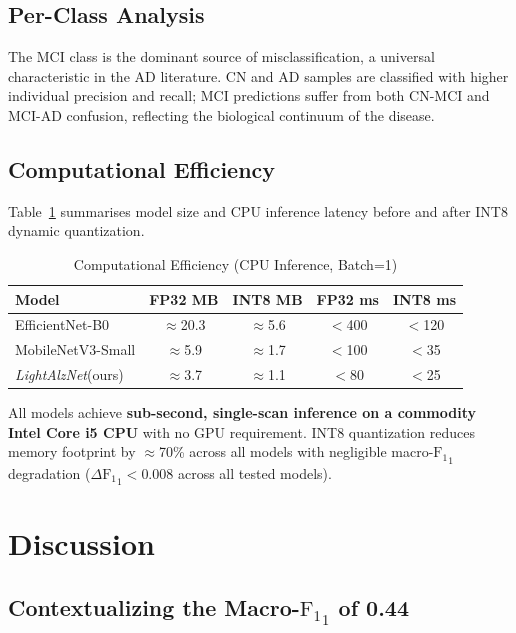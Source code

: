 \documentclass[conference]{IEEEtran}
\newcommand{\modelname}{\textit{LightAlzNet}\xspace}
\newcommand{\F}{\mathrm{F_1}}
\begin{document}
\subsection{Per-Class Analysis}
The MCI class is the dominant source of misclassification, a
universal characteristic in the AD literature. CN and AD
samples are classified with higher individual precision and
recall; MCI predictions suffer from both CN-MCI and MCI-AD
confusion, reflecting the biological continuum of the disease.

\subsection{Computational Efficiency}
Table~\ref{tab:compute} summarises model size and CPU inference
latency before and after INT8 dynamic quantization.

\begin{table}[htbp]
\caption{Computational Efficiency (CPU Inference, Batch=1)}
\label{tab:compute}
\centering
\renewcommand{\arraystretch}{1.1}
\begin{tabular}{lcccc}
\toprule
\textbf{Model} & \textbf{FP32 MB} & \textbf{INT8 MB}
  & \textbf{FP32 ms} & \textbf{INT8 ms} \\
\midrule
EfficientNet-B0   & $\approx$20.3 & $\approx$5.6 & $<$400 & $<$120 \\
MobileNetV3-Small & $\approx$5.9  & $\approx$1.7 & $<$100 & $<$35  \\
\modelname (ours) & $\approx$3.7  & $\approx$1.1 & $<$80  & $<$25  \\
\bottomrule
\end{tabular}
\end{table}

\noindent All models achieve \textbf{sub-second, single-scan
inference on a commodity Intel Core i5 CPU} with no GPU
requirement. INT8 quantization reduces memory footprint by
$\approx$70\% across all models with negligible macro-$\F_1$
degradation ($\Delta\F_1 < 0.008$ across all tested models).

\section{Discussion}
\label{sec:discussion}

\subsection{Contextualizing the Macro-$\F_1$ of 0.44}
\label{sec:defense}
\end{document}
